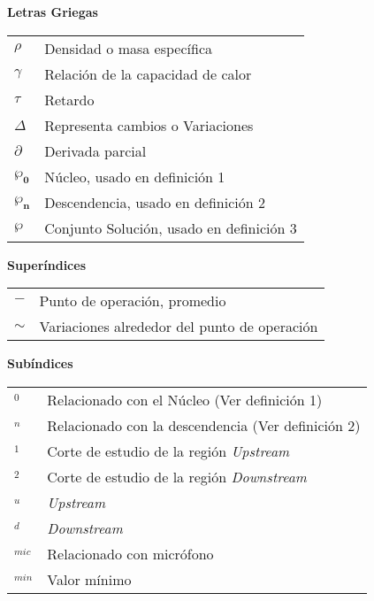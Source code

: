 \newpage

\textbf{Letras Griegas}

\begin{table}[htbp]
\begin{tabular}{l l}
$\rho$ & Densidad o masa específica \\
$\gamma$ & Relación de la capacidad de calor \\
$\tau$ & Retardo \\
$\Delta$ & Representa cambios o Variaciones \\
$\partial$ & Derivada parcial \\
$\boldsymbol{\wp_0}$ & Núcleo, usado en definición 1 \\
$\boldsymbol{\wp_n}$ & Descendencia, usado en definición 2 \\
$\boldsymbol{\wp}$ & Conjunto Solución, usado en definición 3 \\
\end{tabular}
\end{table}


\textbf{Superíndices}

\begin{table}[htbp]
\begin{tabular}{l l}
$-$ & Punto de operación, promedio \\
$\sim$ & Variaciones alrededor del punto de operación \\
\end{tabular}
\end{table}

\textbf{Subíndices}

\begin{table}[htbp]
\begin{tabular}{l l}
$ _0$ & Relacionado con el Núcleo (Ver definición 1)\\
$ _n$ & Relacionado con la descendencia (Ver definición 2)\\
$ _1$ & Corte de estudio de la región \textsl{Upstream} \\
$ _2$ &  Corte de estudio de la región \textsl{Downstream} \\
$ _u$ & \textsl{Upstream} \\
$ _d$ & \textsl{Downstream} \\
$ _{mic}$ & Relacionado con micrófono \\
$ _{min}$ & Valor mínimo \\
\end{tabular}
\end{table}